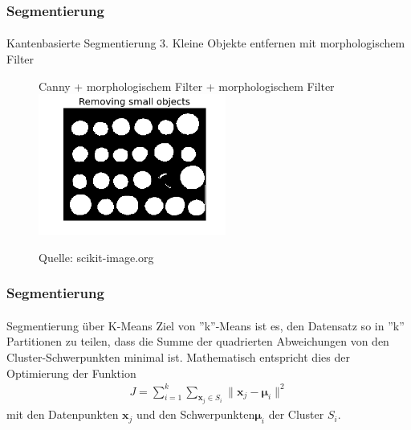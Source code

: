 \documentclass{beamer}
\begin{document}
\begin{frame}
    \frametitle{Segmentierung}
\framesubtitle{}
\begin{block}{Kantenbasierte Segmentierung }
3. Kleine Objekte entfernen mit morphologischem Filter
\end{block}
\begin{figure}[htp]
      \centering
Canny + morphologischem Filter  + morphologischem Filter  \\
    \includegraphics[width=0.55\textwidth]{img/segmentation_edge4} 
      \caption{Quelle: scikit-image.org}
\end{figure}


 \end{frame}


\begin{frame}
    \frametitle{Segmentierung}
\framesubtitle{}
\begin{block}{Segmentierung über K-Means}
Ziel von ''k''-Means ist es, den Datensatz so in ''k'' Partitionen zu teilen, dass die Summe der quadrierten Abweichungen von den Cluster-Schwerpunkten minimal ist. Mathematisch entspricht dies der Optimierung der Funktion
\begin{align*}
J = \sum_{i=1}^{k}  \sum_{\mathbf x_j \in S_{i}} {\| \mathbf x_j - \boldsymbol \mu_i \|^2}
\end{align*}
mit den Datenpunkten $ \mathbf x_j $  und den Schwerpunkten$ \boldsymbol \mu_i$ der Cluster $S_i$.

\end{block}


 \end{frame}
\end{document}
